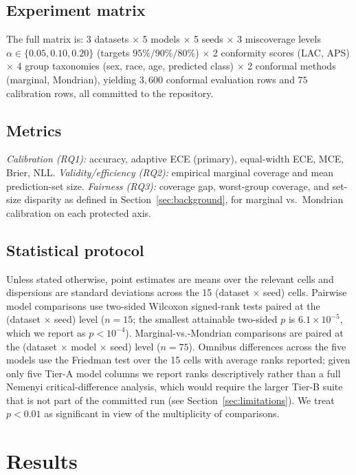 \documentclass[review,12pt]{elsarticle}
\begin{document}
\subsection{Experiment matrix}
The full matrix is: 3 datasets $\times$ 5 models $\times$ 5 seeds $\times$ 3 miscoverage levels $\alpha \in \{0.05, 0.10, 0.20\}$ (targets $95\%/90\%/80\%$) $\times$ 2 conformity scores (LAC, APS) $\times$ 4 group taxonomies (sex, race, age, predicted class) $\times$ 2 conformal methods (marginal, Mondrian), yielding $3{,}600$ conformal evaluation rows and $75$ calibration rows, all committed to the repository.

\subsection{Metrics}
\emph{Calibration (RQ1):} accuracy, adaptive ECE (primary), equal-width ECE, MCE, Brier, NLL. \emph{Validity/efficiency (RQ2):} empirical marginal coverage and mean prediction-set size. \emph{Fairness (RQ3):} coverage gap, worst-group coverage, and set-size disparity as defined in Section~\ref{sec:background}, for marginal vs.\ Mondrian calibration on each protected axis.

\subsection{Statistical protocol}
Unless stated otherwise, point estimates are means over the relevant cells and dispersions are standard deviations across the 15 (dataset $\times$ seed) cells. Pairwise model comparisons use two-sided Wilcoxon signed-rank tests paired at the (dataset $\times$ seed) level ($n=15$; the smallest attainable two-sided $p$ is $6.1\times10^{-5}$, which we report as $p<10^{-4}$). Marginal-vs.-Mondrian comparisons are paired at the (dataset $\times$ model $\times$ seed) level ($n=75$). Omnibus differences across the five models use the Friedman test over the 15 cells with average ranks reported; given only five Tier-A model columns we report ranks descriptively rather than a full Nemenyi critical-difference analysis, which would require the larger Tier-B suite that is not part of the committed run (see Section~\ref{sec:limitations}). We treat $p<0.01$ as significant in view of the multiplicity of comparisons.

\section{Results}
\label{sec:results}
\end{document}

